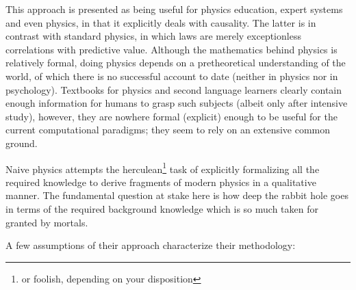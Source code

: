 \documentclass{article} %
\begin{document}
This approach is presented as being useful for physics education, expert
systems and even physics, in that it explicitly deals with causality. The
latter is in contrast with standard physics, in which laws are merely
exceptionless correlations with predictive value. Although the mathematics
behind physics is relatively formal, doing physics depends on a pretheoretical
understanding of the world, of which there is no successful account to date
(neither in physics nor in psychology). Textbooks for physics and second
language learners clearly contain enough information for humans to grasp
such subjects (albeit only after intensive study), however, they are nowhere
formal (explicit) enough to be useful for the current computational paradigms;
they seem to rely on an extensive common ground.

Naive physics attempts the herculean\footnote{or foolish, depending on your
disposition} task of explicitly formalizing all the required knowledge to
derive fragments of modern physics in a qualitative manner. The fundamental
question at stake here is how deep the rabbit hole goes in terms of the
required background knowledge which is so much taken for granted by mortals.

A few assumptions of their approach characterize their methodology:
\end{document}

